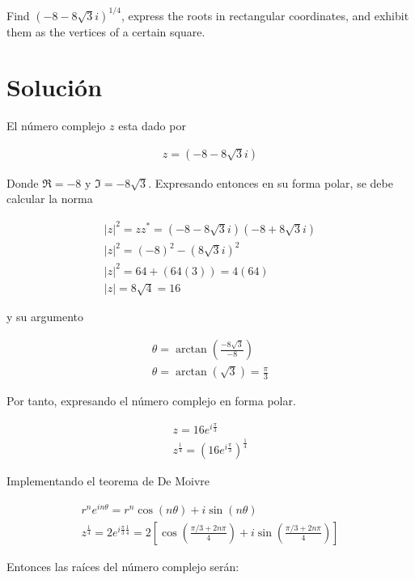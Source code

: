 \begin{problem}{1}
    Find $(-8 -8\sqrt{3}i)^{1/4}$, express the roots in rectangular coordinates, and exhibit them as the vertices of a certain square.
\end{problem}

\section*{Solución}


El número complejo $z$ esta dado por 

\begin{gather*}
    z = (-8 -8\sqrt{3}i)
\end{gather*}

Donde $\Re = -8$ y $\Im = -8 \sqrt{3}$. Expresando entonces en su forma polar, se debe calcular la norma 

\begin{gather*}
    |z|^2 = zz^{*} = (-8 - 8\sqrt{3}i)(-8 + 8\sqrt{3}i)\\
    |z|^2 = (-8)^2 - (8\sqrt{3}i)^2\\
    |z|^2 = 64 + (64(3)) = 4(64)\\
    |z| = 8\sqrt{4} = 16
\end{gather*}

y su argumento

\begin{gather*}
    \theta = \arctan\left(\frac{-8\sqrt{3}}{-8}\right)\\
    \theta = \arctan\left(\sqrt{3}\right) = \frac{\pi}{3}
\end{gather*}

Por tanto, expresando el número complejo en forma polar. 

\begin{gather*}
    z = 16e^{i\frac{\pi}{3}}\\
    z^{\frac{1}{4}} = \left( 16e^{i\frac{\pi}{3}}\right)^{\frac{1}{4}}
\end{gather*}

Implementando el teorema de De Moivre 

\begin{gather*}
    r^ne^{in\theta} = r^n\cos(n\theta) + i\sin(n\theta)\\
    z^{\frac{1}{4}} = 2 e^{i\frac{\pi}{3}\frac{1}{4}} = 2 \left[\cos\left(\frac{\pi/3 + 2n\pi}{4} \right) + i\sin\left(\frac{\pi/3 + 2n\pi}{4}\right)\right]
\end{gather*}

Entonces las raíces del número complejo serán:

